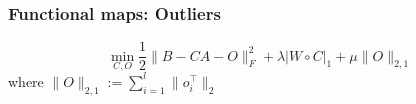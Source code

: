 \documentclass[compress]{beamer}
\begin{document}
\begin{frame}[fragile]
\begin{figure}[htp]
\begin{center}
  \end{center}
\end{figure}
\end{frame}

\begin{frame}[fragile]
\frametitle{Functional maps: Outliers}
$$
	\min_{C,O} \frac{1}{2} \| B - CA -O \|_F^2 + \lambda |W \circ C|_1 + \mu \|O\|_{2,1}
$$
where $\|O\|_{2,1}:= \sum_{i=1}^l \|o_i^\top \|_2$
\end{frame}
\end{document}
